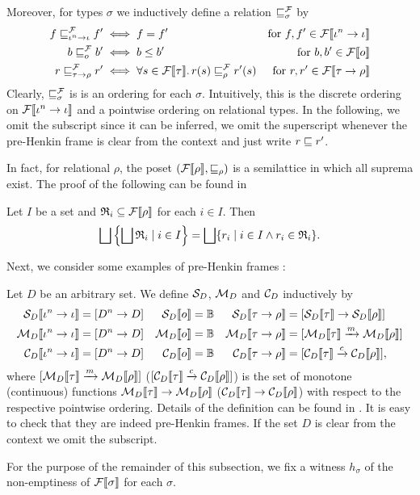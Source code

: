 \documentclass[a4paper,twoside,notitlepage,openright,11pt]{report}
\begin{document}
Moreover, for types $\sigma$ we inductively define a relation $\sqsubseteq^\mathcal F_\sigma$ by
\begin{align*}
  f\sqsubseteq^\mathcal F_{\iota^n\to \iota} f'&\iff f=f'&\text{for }f,f'\in{\mathcal F}\llbracket\iota^n\to\iota\rrbracket\\
  b\sqsubseteq^\mathcal F_o b'&\iff b\leq b'&\text{for }b,b'\in{\mathcal F}\llbracket o\rrbracket\\
  r\sqsubseteq^\mathcal F_{\tau\to\rho} r'&\iff\forall s\in{\mathcal F}\llbracket\tau\rrbracket\ldotp r(s)\sqsubseteq^\mathcal F_\rho r'(s)&\text{for }r,r'\in{\mathcal F}\llbracket\tau\to\rho\rrbracket
\end{align*}
Clearly, $\sqsubseteq^\mathcal F_\sigma$ is is an ordering for each $\sigma$. Intuitively, this is the discrete ordering on ${\mathcal F}\llbracket\iota^n\to\iota\rrbracket$ and a pointwise ordering on relational types.
In the following, we omit the subscript since it can be inferred, we omit the superscript whenever the pre-Henkin frame is clear from the context and just write $r\sqsubseteq r'$.

In fact, for relational $\rho$, the poset $({\mathcal F}\llbracket\rho\rrbracket,\sqsubseteq_\rho)$ is a semilattice in which all suprema exist.
The proof of the following can be found in \cite[Proposition 2.1.4]{AJ95}
\begin{lemma}
  \label{lem:swapun}
  Let $I$ be a set and $\mathfrak R_i\subseteq{\mathcal F}\llbracket\rho\rrbracket$ for each $i\in I$.
  Then
  \begin{align*}
    \bigsqcup\left\{\bigsqcup\mathfrak R_i\mid i\in I\right\}=\bigsqcup\{r_i\mid i\in I\land r_i\in\mathfrak R_i\}.
  \end{align*}
\end{lemma}

Next, we consider some examples of pre-Henkin frames \cite{BOR18,AJ95}:
\begin{example}
  Let $D$ be an arbitrary set. We define $\mathcal S_D$, $\mathcal M_D$ and $\mathcal C_D$ inductively by
  \begin{align*}
    {\mathcal S_D}\llbracket\iota^n\to\iota\rrbracket&=[D^n\to D]&{\mathcal S_D}\llbracket o\rrbracket&=\mathbb B&{\mathcal S_D}\llbracket\tau\to\rho\rrbracket&=[{\mathcal S_D}\llbracket\tau\rrbracket\to{\mathcal S_D}\llbracket\rho\rrbracket]\\
    {\mathcal M_D}\llbracket\iota^n\to\iota\rrbracket&=[D^n\to D]&{\mathcal M_D}\llbracket o\rrbracket&=\mathbb B&{\mathcal M_D}\llbracket\tau\to\rho\rrbracket&=[{\mathcal M_D}\llbracket\tau\rrbracket\xrightarrow{m}{\mathcal M_D}\llbracket\rho\rrbracket]\\
    {\mathcal C_D}\llbracket\iota^n\to\iota\rrbracket&=[D^n\to D]&{\mathcal C_D}\llbracket o\rrbracket&=\mathbb B&{\mathcal C_D}\llbracket\tau\to\rho\rrbracket&=[{\mathcal C_D}\llbracket\tau\rrbracket\xrightarrow{c}{\mathcal C_D}\llbracket\rho\rrbracket],
  \end{align*}
  where $[{\mathcal M_D}\llbracket\tau\rrbracket\xrightarrow{m}{\mathcal M_D}\llbracket\rho\rrbracket]$ ($[{\mathcal C_D}\llbracket\tau\rrbracket\xrightarrow{c}{\mathcal C_D}\llbracket\rho\rrbracket]$) is the set of monotone (continuous) functions ${\mathcal M_D}\llbracket\tau\rrbracket\to{\mathcal M_D}\llbracket\rho\rrbracket$ (${\mathcal C_D}\llbracket\tau\rrbracket\to{\mathcal C_D}\llbracket\rho\rrbracket$) with respect to the respective pointwise ordering. Details of the definition can be found in \cite{AJ95}.
It is easy to check that they are indeed pre-Henkin frames.
If the set $D$ is clear from the context we omit the subscript.
\end{example}
For the purpose of the remainder of this subsection, we fix a witness $h_\sigma$ of the non-emptiness of ${\mathcal F}\llbracket\sigma\rrbracket$ for each $\sigma$.
\end{document}
